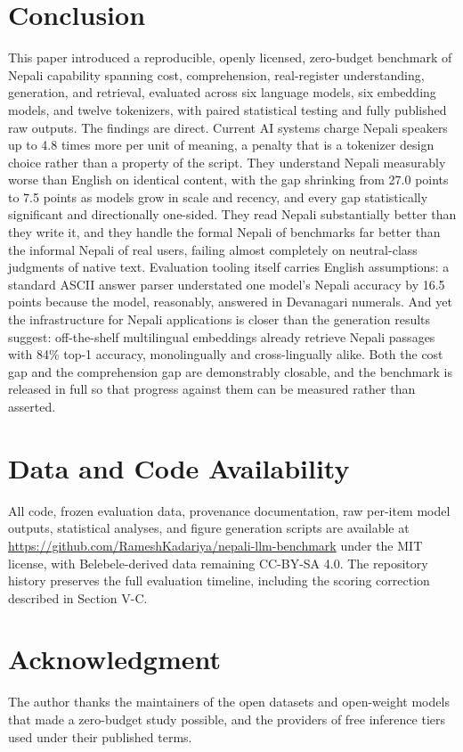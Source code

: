 \documentclass[conference]{IEEEtran}
\begin{document}
\section{Conclusion}
This paper introduced a reproducible, openly licensed, zero-budget benchmark of Nepali capability spanning cost, comprehension, real-register understanding, generation, and retrieval, evaluated across six language models, six embedding models, and twelve tokenizers, with paired statistical testing and fully published raw outputs. The findings are direct. Current AI systems charge Nepali speakers up to 4.8 times more per unit of meaning, a penalty that is a tokenizer design choice rather than a property of the script. They understand Nepali measurably worse than English on identical content, with the gap shrinking from 27.0 points to 7.5 points as models grow in scale and recency, and every gap statistically significant and directionally one-sided. They read Nepali substantially better than they write it, and they handle the formal Nepali of benchmarks far better than the informal Nepali of real users, failing almost completely on neutral-class judgments of native text. Evaluation tooling itself carries English assumptions: a standard ASCII answer parser understated one model's Nepali accuracy by 16.5 points because the model, reasonably, answered in Devanagari numerals. And yet the infrastructure for Nepali applications is closer than the generation results suggest: off-the-shelf multilingual embeddings already retrieve Nepali passages with 84\% top-1 accuracy, monolingually and cross-lingually alike. Both the cost gap and the comprehension gap are demonstrably closable, and the benchmark is released in full so that progress against them can be measured rather than asserted.

\section*{Data and Code Availability}
All code, frozen evaluation data, provenance documentation, raw per-item model outputs, statistical analyses, and figure generation scripts are available at \url{https://github.com/RameshKadariya/nepali-llm-benchmark} under the MIT license, with Belebele-derived data remaining CC-BY-SA 4.0. The repository history preserves the full evaluation timeline, including the scoring correction described in Section V-C.

\section*{Acknowledgment}
The author thanks the maintainers of the open datasets and open-weight models that made a zero-budget study possible, and the providers of free inference tiers used under their published terms.
\end{document}
